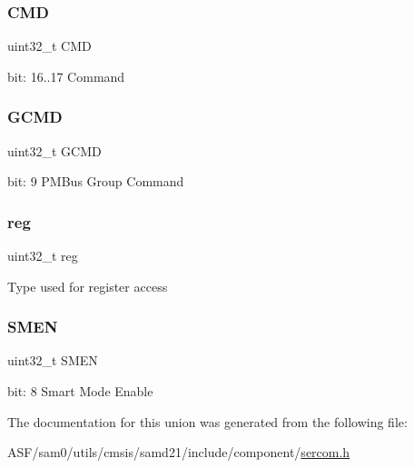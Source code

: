 \subsubsection{\texorpdfstring{CMD}{CMD}}
{\footnotesize\ttfamily uint32\+\_\+t C\+MD}

bit\+: 16..17 Command \mbox{\label{union_s_e_r_c_o_m___i2_c_s___c_t_r_l_b___type_aef48418e042792ba139d48803d664101}} 
\subsubsection{\texorpdfstring{GCMD}{GCMD}}
{\footnotesize\ttfamily uint32\+\_\+t G\+C\+MD}

bit\+: 9 P\+M\+Bus Group Command \mbox{\label{union_s_e_r_c_o_m___i2_c_s___c_t_r_l_b___type_a6b91636401516a477989a336376d7b40}} 
\subsubsection{\texorpdfstring{reg}{reg}}
{\footnotesize\ttfamily uint32\+\_\+t reg}

Type used for register access \mbox{\label{union_s_e_r_c_o_m___i2_c_s___c_t_r_l_b___type_a31bff5f79c11bb1b5fe501ccb4738f12}} 
\subsubsection{\texorpdfstring{SMEN}{SMEN}}
{\footnotesize\ttfamily uint32\+\_\+t S\+M\+EN}

bit\+: 8 Smart Mode Enable 

The documentation for this union was generated from the following file\+:\begin{DoxyCompactItemize}
\item 
A\+S\+F/sam0/utils/cmsis/samd21/include/component/\mbox{\hyperlink{utils_2cmsis_2samd21_2include_2component_2sercom_8h}{sercom.\+h}}\end{DoxyCompactItemize}
